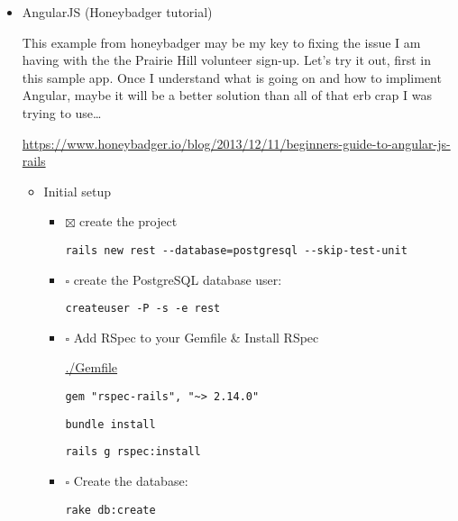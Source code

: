 \documentclass[11pt]{article}
\begin{document}
\begin{itemize}
\item AngularJS (Honeybadger tutorial)
\label{sec-1-3-3-1}

This example from honeybadger may be my key to fixing the issue I am having with
the the Prairie Hill volunteer sign-up. Let's try it out, first in this sample
app. Once I understand what is going on and how to impliment Angular, maybe it 
will be a better solution than all of that erb crap I was trying to use\ldots{}

\url{https://www.honeybadger.io/blog/2013/12/11/beginners-guide-to-angular-js-rails}

\begin{itemize}
\item Initial setup
\label{sec-1-3-3-1-0-1}

\begin{itemize}
\item $\boxtimes$ create the project

\begin{verbatim}
rails new rest --database=postgresql --skip-test-unit
\end{verbatim}

\item $\square$ create the PostgreSQL database user:

\begin{verbatim}
createuser -P -s -e rest
\end{verbatim}

\item $\square$ Add RSpec to your Gemfile \& Install RSpec

\url{./Gemfile}

\begin{verbatim}
gem "rspec-rails", "~> 2.14.0"
\end{verbatim}

\begin{verbatim}
bundle install
\end{verbatim}

\begin{verbatim}
rails g rspec:install
\end{verbatim}

\item $\square$ Create the database:

\begin{verbatim}
rake db:create
\end{verbatim}
\end{itemize}


\end{itemize}
\end{itemize}
\end{document}
